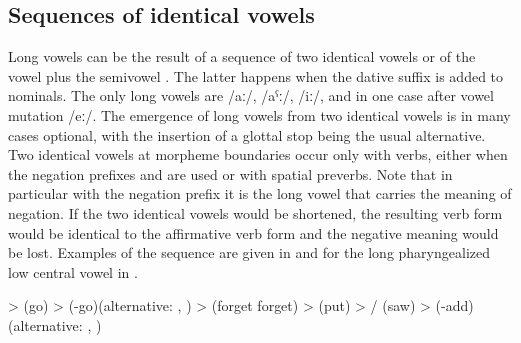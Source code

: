 \subsection{Sequences of identical vowels}
\label{ssec:Sequences of identical vowels}

Long vowels can be the result of a sequence of two identical vowels or of the vowel  plus the semivowel . The latter happens when the dative suffix is added to nominals. The only long vowels are /aː/, /aˁː/, /iː/, and in one case after vowel mutation /eː/. The emergence of long vowels from two identical vowels is in many cases optional, with the insertion of a glottal stop being the usual alternative. Two identical vowels at morpheme boundaries occur only with verbs, either when the negation prefixes  and  are used or with spatial preverbs. Note that in particular with the negation prefix it is the long vowel that carries the meaning of negation. If the two identical vowels would be shortened, the resulting verb form would be identical to the affirmative verb form and the negative meaning would be lost. Examples of the sequence are given in  and for the long pharyngealized low central vowel in .
%
\begin{exe}
	\ex	\label{ex:identical vowels A phon}
	\begin{xlist}
		\ex	{} >   (go)
		\ex	{} >   (-go)\newline\hspace*{1em}(alternative: , )
		\ex	{} >  \newline\hspace*{1em}(forget forget) 
		\ex	{} >  \newline\hspace*{1em}(put)
		\ex	{} > \slash{}  (saw)
		\ex	{} >   (-add)\newline\hspace*{1em}(alternative: , )
	\end{xlist}
\end{exe}

